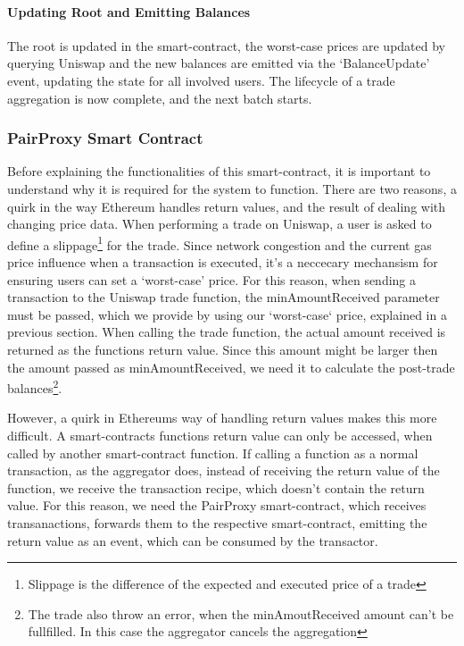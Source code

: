 \documentclass[../../thesis.tex]{subfiles}
\begin{document}
\paragraph{Updating Root and Emitting Balances}
The root is updated in the smart-contract, the worst-case prices are updated by querying Uniswap and the new balances are emitted via the `BalanceUpdate' event, updating the state for all involved users. The lifecycle of a trade aggregation is now complete, and the next batch starts. 

\subsubsection{PairProxy Smart Contract} \label{pairProxy}
Before explaining the functionalities of this smart-contract, it is important to understand why it is required for the system to function. There are two reasons, a quirk in the way Ethereum handles return values, and the result of dealing with changing price data.
When performing a trade on Uniswap, a user is asked to define a slippage\footnote{Slippage is the difference of the expected and executed price of a trade} for the trade. Since network congestion and the current gas price influence when a transaction is executed, it's a neccecary mechansism for ensuring users can set a `worst-case' price. For this reason, when sending a transaction to the Uniswap trade function, the minAmountReceived parameter must be passed, which we provide by using our `worst-case` price, explained in a previous section. When calling the trade function, the actual amount received is returned as the functions return value. Since this amount might be larger then the amount passed as minAmountReceived, we need it to calculate the post-trade balances\footnote{The trade also throw an error, when the minAmoutReceived amount can't be fullfilled. In this case the aggregator cancels the aggregation}. 

However, a quirk in Ethereums way of handling return values makes this more difficult. A smart-contracts functions return value can only be accessed, when called by another smart-contract function. If calling a function as a normal transaction, as the aggregator does, instead of receiving the return value of the function, we receive the transaction recipe, which doesn't contain the return value. For this reason, we need the PairProxy smart-contract, which receives transanactions, forwards them to the respective smart-contract, emitting the return value as an event, which can be consumed by the transactor. 
\end{document}
